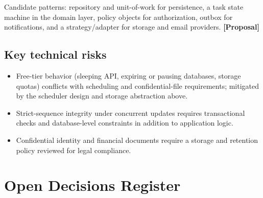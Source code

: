 \documentclass[11pt,a4paper]{article}
\newcommand{\tagprop}{\textcolor{orange!80!black}{\textbf{[Proposal]}}}
\begin{document}
Candidate patterns: repository and unit-of-work for persistence, a task state
machine in the domain layer, policy objects for authorization, outbox for
notifications, and a strategy/adapter for storage and email providers.
\tagprop{}

\subsection{Key technical risks}

\begin{itemize}
	\item Free-tier behavior (sleeping API, expiring or pausing databases, storage
	      quotas) conflicts with scheduling and confidential-file requirements;
	      mitigated
	      by the scheduler design and storage abstraction above.
	\item Strict-sequence integrity under concurrent updates requires
	      transactional checks and database-level constraints in addition to
	      application
	      logic.
	\item Confidential identity and financial documents require a storage and
	      retention policy reviewed for legal compliance.
\end{itemize}

\appendix
\section{Open Decisions Register}\label{app:open}
\end{document}

